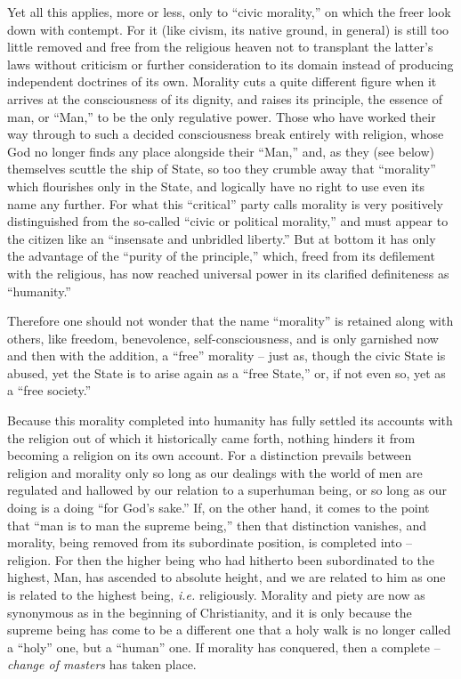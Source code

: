 \documentclass[12pt,a4paper]{book}
\begin{document}
Yet all this applies, more or less, only to ``civic morality,'' on which the 
freer look down with contempt. For it (like civism, its native ground, in 
general) is still too little removed and free from the religious heaven not to 
transplant the latter's laws without criticism or further consideration to its 
domain instead of producing independent doctrines of its own. Morality cuts a 
quite different figure when it arrives at the consciousness of its dignity, 
and raises its principle, the essence of man, or ``Man,'' to be the only 
regulative power. Those who have worked their way through to such a decided 
consciousness break entirely with religion, whose God no longer finds any 
place alongside their ``Man,'' and, as they (see below) themselves scuttle 
the ship of State, so too they crumble away that ``morality'' which 
flourishes only in the State, and logically have no right to use even its name 
any further. For what this ``critical'' party calls morality is very 
positively distinguished from the so-called ``civic or political morality,'' 
and must appear to the citizen like an ``insensate and unbridled liberty.'' 
But at bottom it has only the advantage of the ``purity of the principle,'' 
which, freed from its defilement with the religious, has now reached universal 
power in its clarified definiteness as ``humanity.''

Therefore one should not wonder that the name ``morality'' is retained along 
with others, like freedom, benevolence, self-consciousness, and is only 
garnished now and then with the addition, a ``free'' morality -- just as, 
though the civic State is abused, yet the State is to arise again as a ``free 
State,'' or, if not even so, yet as a ``free society.''

Because this morality completed into humanity has fully settled its accounts 
with the religion out of which it historically came forth, nothing hinders it 
from becoming a religion on its own account. For a distinction prevails 
between religion and morality only so long as our dealings with the world of 
men are regulated and hallowed by our relation to a superhuman being, or so 
long as our doing is a doing ``for God's sake.'' If, on the other hand, it 
comes to the point that ``man is to man the supreme being,'' then that 
distinction vanishes, and morality, being removed from its subordinate 
position, is completed into -- religion. For then the higher being who had 
hitherto been subordinated to the highest, Man, has ascended to absolute 
height, and we are related to him as one is related to the highest being, 
\textit{i.e.} religiously. Morality and piety are now as synonymous as in the 
beginning of Christianity, and it is only because the supreme being has come 
to be a different one that a holy walk is no longer called a ``holy'' one, 
but a ``human'' one. If morality has conquered, then a complete -- 
\textit{change of masters} has taken place.
\end{document}
